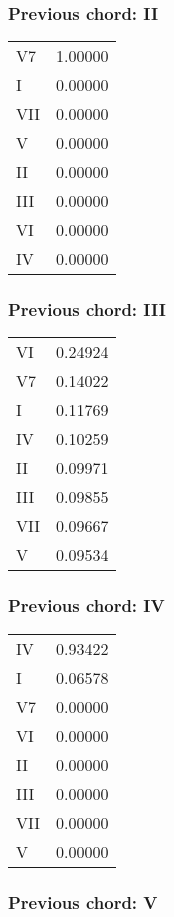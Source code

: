 \subsubsection*{Previous chord: II}


\begin{tabular}{l l}
V7 & 1.00000 \\
I & 0.00000 \\
VII & 0.00000 \\
V & 0.00000 \\
II & 0.00000 \\
III & 0.00000 \\
VI & 0.00000 \\
IV & 0.00000 \\
\end{tabular}


\subsubsection*{Previous chord: III}


\begin{tabular}{l l}
VI & 0.24924 \\
V7 & 0.14022 \\
I & 0.11769 \\
IV & 0.10259 \\
II & 0.09971 \\
III & 0.09855 \\
VII & 0.09667 \\
V & 0.09534 \\
\end{tabular}


\subsubsection*{Previous chord: IV}


\begin{tabular}{l l}
IV & 0.93422 \\
I & 0.06578 \\
V7 & 0.00000 \\
VI & 0.00000 \\
II & 0.00000 \\
III & 0.00000 \\
VII & 0.00000 \\
V & 0.00000 \\
\end{tabular}


\subsubsection*{Previous chord: V}


